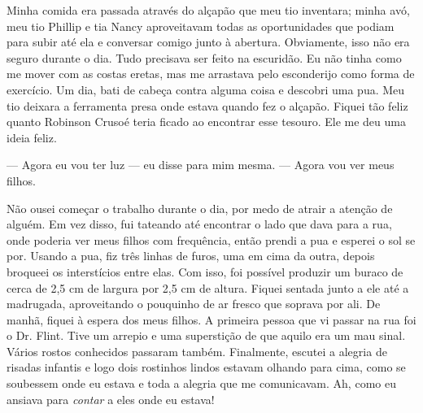 Minha comida era passada através do
alçapão que meu tio inventara; minha avó, meu tio Phillip e tia Nancy
aproveitavam todas as oportunidades que podiam para subir até ela e
conversar comigo junto à abertura. Obviamente, isso não era seguro
durante o dia. Tudo precisava ser feito na escuridão. Eu não tinha como
me mover com as costas eretas, mas me arrastava pelo esconderijo como
forma de exercício. Um dia, bati de cabeça contra alguma coisa e
descobri uma pua. Meu tio deixara a ferramenta presa onde estava quando
fez o alçapão. Fiquei tão feliz quanto Robinson Crusoé teria ficado ao
encontrar esse tesouro. Ele me deu uma ideia feliz.

--- Agora eu vou ter luz --- eu disse para mim mesma. --- Agora vou ver
meus filhos.

Não ousei começar o trabalho durante o dia, por medo de atrair a atenção
de alguém. Em vez disso, fui tateando até encontrar o lado que dava para
a rua, onde poderia ver meus filhos com frequência, então prendi a pua e
esperei o sol se por. Usando a pua, fiz três linhas de furos, uma em
cima da outra, depois broqueei os interstícios entre elas. Com isso, foi
possível produzir um buraco de cerca de 2,5 cm de largura por 2,5 cm de
altura. Fiquei sentada junto a ele até a madrugada, aproveitando o
pouquinho de ar fresco que soprava por ali. De manhã, fiquei à espera
dos meus filhos. A primeira pessoa que vi passar na rua foi o Dr. Flint.
Tive um arrepio e uma superstição de que aquilo era um mau sinal. Vários
rostos conhecidos passaram também. Finalmente, escutei a alegria de
risadas infantis e logo dois rostinhos lindos estavam olhando para cima,
como se soubessem onde eu estava e toda a alegria que me comunicavam.
Ah, como eu ansiava para \emph{contar} a eles onde eu estava!

